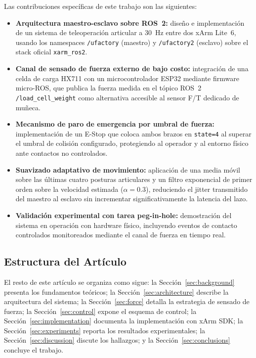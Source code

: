 \documentclass[journal,10pt,twoside]{IEEEtran}
\begin{document}
Las contribuciones específicas de este trabajo son las siguientes:
\begin{itemize}
  \item \textbf{Arquitectura maestro-esclavo sobre ROS~2:} diseño e
        implementación de un sistema de teleoperación articular a
        30~Hz entre dos xArm Lite~6, usando los namespaces
        \texttt{/ufactory} (maestro) y \texttt{/ufactory2} (esclavo)
        sobre el stack oficial \texttt{xarm\_ros2}.
  \item \textbf{Canal de sensado de fuerza externo de bajo costo:}
        integración de una celda de carga HX711 con un
        microcontrolador ESP32 mediante firmware micro-ROS, que
        publica la fuerza medida en el tópico ROS~2
        \texttt{/load\_cell\_weight} como alternativa accesible
        al sensor F/T dedicado de muñeca.
  \item \textbf{Mecanismo de paro de emergencia por umbral de fuerza:}
        implementación de un E-Stop que coloca ambos brazos en
        \texttt{state=4} al superar el umbral de colisión configurado,
        protegiendo al operador y al entorno físico ante contactos
        no controlados.
  \item \textbf{Suavizado adaptativo de movimiento:} aplicación de
        una media móvil sobre las últimas cuatro posturas articulares
        y un filtro exponencial de primer orden sobre la velocidad
        estimada ($\alpha{=}0.3$), reduciendo el jitter transmitido
        del maestro al esclavo sin incrementar significativamente
        la latencia del lazo.
  \item \textbf{Validación experimental con tarea peg-in-hole:}
        demostración del sistema en operación con hardware físico,
        incluyendo eventos de contacto controlados monitoreados
        mediante el canal de fuerza en tiempo real.
\end{itemize}

\subsection{Estructura del Artículo}
El resto de este artículo se organiza como sigue:
la Sección~\ref{sec:background} presenta los fundamentos teóricos;
la Sección~\ref{sec:architecture} describe la arquitectura del sistema;
la Sección~\ref{sec:force} detalla la estrategia de sensado de fuerza;
la Sección~\ref{sec:control} expone el esquema de control;
la Sección~\ref{sec:implementation} documenta la implementación con xArm SDK;
la Sección~\ref{sec:experiments} reporta los resultados experimentales;
la Sección~\ref{sec:discussion} discute los hallazgos;
y la Sección~\ref{sec:conclusions} concluye el trabajo.
\end{document}
